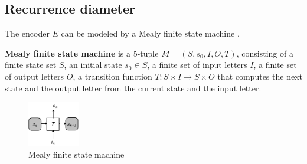\documentclass[journal]{IEEEtran}
\begin{document}
%




\subsection{Recurrence diameter}\label{subsec_recdia}

The encoder $E$ can be modeled by a Mealy finite state machine \cite{MEALY}.

\begin{definition11}\label{MealyFSM}%
\textbf{Mealy finite state machine} is a 5-tuple $M=(S,s_0,I,O,T)$,
consisting of a finite state set $S$,
an initial state $s_0\in S$,
a finite set of input letters $I$,
a finite set of output letters $O$,
a transition function $T: S\times I\to S\times O$ that computes the next state and the output letter from the current state and the input letter.
\end{definition11}
\begin{figure}[t]
\begin{center}
\includegraphics[width=0.20\textwidth]{mealy}
\end{center}
\caption{Mealy finite state machine}
  \label{mealy}
\end{figure}
\end{document}
